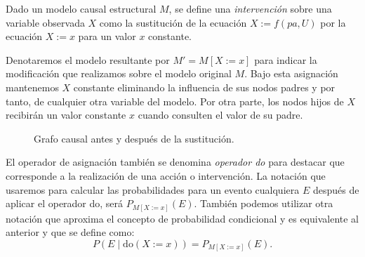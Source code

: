 \documentclass[oneside,openright,titlepage,numbers=noenddot,openany,headinclude,footinclude=true,
cleardoublepage=empty,abstractoff,BCOR=5mm,paper=a4,fontsize=12pt,main=spanish]{scrreprt}
\begin{document}
\begin{definition}[Intervención]
Dado un modelo causal estructural $M$, se define una \textit{intervención} sobre una variable observada $X$ como la sustitución de la ecuación $X:=f(pa,U)$ por la ecuación $X:=x$ para un valor $x$ constante.
\end{definition}

\clearpage

Denotaremos el modelo resultante por $M' = M[X := x]$ para indicar la modificación que realizamos sobre el modelo original $M$. Bajo esta asignación mantenemos $X$ constante eliminando la influencia de sus nodos padres y por tanto, de cualquier otra variable del modelo. Por otra parte, los nodos hijos de $X$ recibirán un valor constante $x$ cuando consulten el valor de su padre.\\

\begin{figure}[h]
\centering
{}
\caption{Grafo causal antes y después de la sustitución.}
\end{figure}

El operador de asignación también se denomina \textit{operador do} para destacar que corresponde a la realización de una acción o intervención. La notación que usaremos para calcular las probabilidades para un evento cualquiera $E$ después de aplicar el operador do, será $P_{M[X:=x]}(E)$. También podemos utilizar otra notación que aproxima el concepto de probabilidad condicional y es equivalente al anterior y que se define como: 
\begin{equation*}
P(E \mid \text{do}(X:=x))=P_{M[X:=x]}(E).
\end{equation*}
\end{document}
